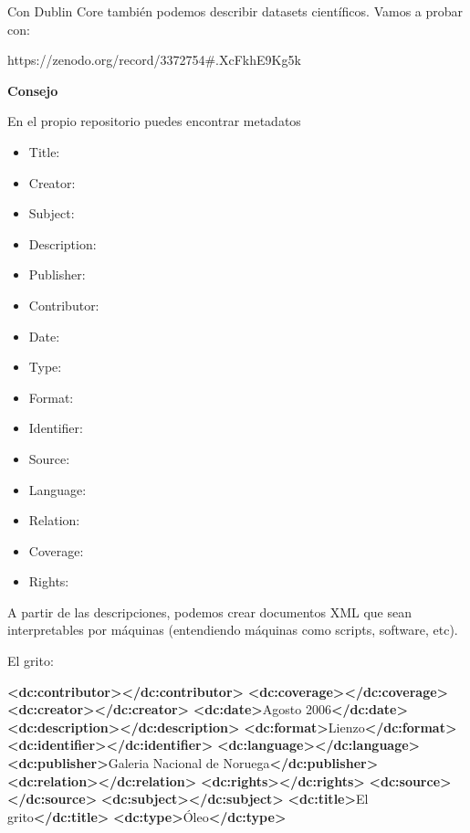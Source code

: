 \documentclass[11pt]{article}
\providecommand{\tightlist}{%
      \setlength{\itemsep}{0pt}\setlength{\parskip}{0pt}}
\newenvironment{Shaded}{}{}
\newcommand{\KeywordTok}[1]{\textcolor[rgb]{0.00,0.44,0.13}{\textbf{{#1}}}}
\newcommand{\NormalTok}[1]{{#1}}
\begin{document}
    Con Dublin Core también podemos describir datasets científicos. Vamos a
probar con:

https://zenodo.org/record/3372754\#.XcFkhE9Kg5k

\textbf{Consejo}

En el propio repositorio puedes encontrar metadatos

\begin{itemize}
\tightlist
\item
  Title:
\item
  Creator:
\item
  Subject: ~
\item
  Description:
\item
  Publisher:
\item
  Contributor:
\item
  Date:
\item
  Type:
\item
  Format:
\item
  Identifier:
\item
  Source:
\item
  Language:
\item
  Relation:
\item
  Coverage: ~
\item
  Rights:
\end{itemize}

    A partir de las descripciones, podemos crear documentos XML que sean
interpretables por máquinas (entendiendo máquinas como scripts,
software, etc).

El grito:

\begin{Shaded}
\begin{Highlighting}[]
\KeywordTok{<dc:contributor></dc:contributor>}
\KeywordTok{<dc:coverage></dc:coverage>}
\KeywordTok{<dc:creator></dc:creator>}
\KeywordTok{<dc:date>}\NormalTok{Agosto 2006}\KeywordTok{</dc:date>}
\KeywordTok{<dc:description></dc:description>}
\KeywordTok{<dc:format>}\NormalTok{Lienzo}\KeywordTok{</dc:format>}
\KeywordTok{<dc:identifier></dc:identifier>}
\KeywordTok{<dc:language></dc:language>}
\KeywordTok{<dc:publisher>}\NormalTok{Galeria Nacional de Noruega}\KeywordTok{</dc:publisher>}
\KeywordTok{<dc:relation></dc:relation>}
\KeywordTok{<dc:rights></dc:rights>}
\KeywordTok{<dc:source></dc:source>}
\KeywordTok{<dc:subject></dc:subject>}
\KeywordTok{<dc:title>}\NormalTok{El grito}\KeywordTok{</dc:title>}
\KeywordTok{<dc:type>}\NormalTok{Óleo}\KeywordTok{</dc:type>}
\end{Highlighting}
\end{Shaded}
\end{document}
